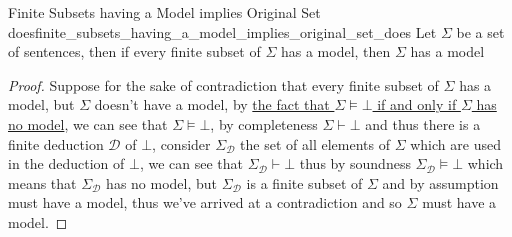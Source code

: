 \begin{proposition}{Finite Subsets having a Model implies Original Set
does}{finite_subsets_having_a_model_implies_original_set_does}
Let \( \Sigma  \) be a set of sentences, then if every finite subset of \(
\Sigma  \) has a model, then \( \Sigma  \) has a model
\end{proposition}
\begin{proof}
    Suppose for the sake of contradiction that every finite subset of \(
    \Sigma  \)  has a model, but \( \Sigma  \) doesn't have a model, by
    \hyperref[propositions:implying_a_contradiction_means_no_model]{the fact
    that \( \Sigma \models \bot  \) if and only if \( \Sigma  \) has no model},
    we can see that \( \Sigma \models \bot  \), by completeness \( \Sigma \vdash
    \bot \) and thus there is a finite deduction \( \mathcal{ D }   \) of \(
    \bot  \), consider \( \Sigma _{ \mathcal{ D }   }  \) the set of all
    elements of \( \Sigma \) which are used in the deduction of \( \bot  \), we
    can see that \( \Sigma _{ \mathcal{ D }   } \vdash \bot \) thus by soundness
    \( \Sigma _{ \mathcal{ D}   } \models \bot  \) which means that \( \Sigma _{
    \mathcal{ D }   }  \) has no model, but \( \Sigma _{ \mathcal{ D }   }  \)
    is a finite subset of \( \Sigma  \) and by assumption must have a model,
    thus we've arrived at a contradiction and so \( \Sigma  \) must have a
    model.
\end{proof}
